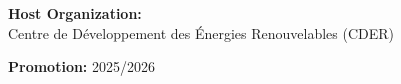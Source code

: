\documentclass[12pt,a4paper]{report}
\begin{document}
\begin{titlepage}
    \vfill

    {\large
    \textbf{Host Organization:}\\
    Centre de D\'eveloppement des \'Energies Renouvelables (CDER)\\
    \par}
    \vspace{0.5cm}

    {\large \textbf{Promotion:} 2025/2026\par}

\end{titlepage}












\tableofcontents

\listoffigures
\listoftables

\end{document}
